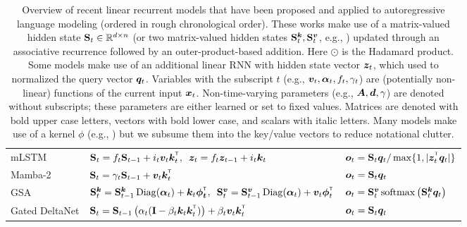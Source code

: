 \begin{table}[t!]
{\begin{tabular}{l ll}
    mLSTM  \cite{beck2024xlstm} &$\rmS_t = f_t \rmS_{t-1} + i_t \vv_t  \vk_t^\intercal, \,\,\, \vz_t = f_t \vz_{t-1} + i_t \vk_t$ & $\vo_t = \rmS_t \vq_t / \max\{1, |\vz_t^\intercal \vq_t |\}$  \\
    Mamba-2 \cite{mamba2} & $\rmS_t = \gamma_t \rmS_{t-1}  +  \vv_t  \vk_t^\intercal $ & ${\bm{o}}_t = {\mathbf{S}}_t {\bm{q}}_t$  \\
    GSA \cite{zhang2024gated} &  $\tiny{\rmS^{\vk}_t = \rmS^{\vk}_{t-1} \operatorname{Diag}(\balpha_t) +\vk_t \boldsymbol{\phi_t} ^\intercal, \,\,\,  \rmS^{\vv}_t = \rmS^{\vv}_{t-1}\operatorname{Diag}(\balpha_t) +  \vv_t\boldsymbol{\phi}_t^\intercal}$  &  ${\bm{o}}_t = {\mathbf{S}}_t^{{\bm{v}}}\operatorname{softmax}\left( {\mathbf{S}}^{{\bm{k}}}_t {\bm{q}}_t\right)$ \\
    Gated DeltaNet \cite{yang2024gateddeltanetworksimproving} & $\rmS_t =  \rmS_{t-1} \left(\alpha_t(\mathbf{I} - \beta_t \vk_t \vk_t^\intercal)\right) + \beta_t \vv_t  \vk_t^\intercal$ & ${\bm{o}}_t = {\mathbf{S}}_t {\bm{q}}_t$ \\
    \bottomrule
\end{tabular}
}
\vspace{1mm}
\caption{Overview of recent linear recurrent models that have been proposed and applied to autoregressive language modeling (ordered in rough chronological order). These works make use of a matrix-valued hidden state ${\mathbf{S}}_{t} \in \mathbb{R}^{d\times n}$ (or two matrix-valued hidden states ${\mathbf{S}}_{t}^{{\bm{k}}}, {\mathbf{S}}_{t}^{{\bm{v}}}$, e.g., \cite{peng_abc_2022,zhang2024gated}) updated through an associative recurrence followed by an outer-product-based addition. Here $\odot$ is the Hadamard product. Some models make use of an additional linear RNN with hidden state vector ${\bm{z}}_t$, which used to normalized the query vector ${\bm{q}}_t$. Variables with the subscript $t$ (e.g., ${\bm{v}}_t,  {\bm{\alpha}}_t, f_t, \gamma_t$) are (potentially non-linear) functions of the current input ${\bm{x}}_t$. Non-time-varying  parameters (e.g., ${\bm{A}}, {\bm{d}}, \gamma$) are denoted without subscripts; these parameters are either learned or  set to fixed values. Matrices are denoted with bold upper case letters, vectors with bold lower case, and scalars with italic letters.  Many models make use of a kernel $\phi$ (e.g., \cite{schlag_linear_2021,peng_random_2021}) but we subsume them into the key/value vectors to reduce notational clutter. 
}
\vspace{-8mm}
\label{tab:overview}
\end{table}
